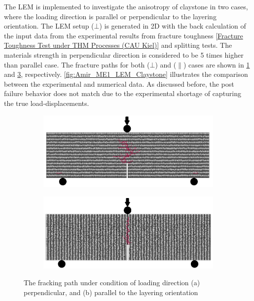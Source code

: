 The LEM is implemented to investigate the anisotropy of claystone in two cases, where the loading direction is parallel or perpendicular to the layering orientation. The LEM setup ($\bot$) is generated in 2D with the back calculation of the input data from the experimental results from fracture toughness \ref{Fracture Toughness Test under THM Processes (CAU Kiel)} and splitting \label{Brazilian Disk Test under THM Processes (CAU Kiel)} tests. The materials strength in perpendicular direction is considered to be 5 times higher than parallel case. The fracture paths for both ($\bot$) and ($\parallel$) cases are shown in \ref{fig:Amir_ME1_LEM_Perpendicular} and \ref{fig:Amir_ME1_LEM_Parallel}, respectively. \ref{fig:Amir_ME1_LEM_Claystone} illustrates the comparison between the experimental and numerical data. As discussed before, the post failure behavior does not match due to the experimental shortage of capturing the true load-displacements.

\begin{figure}[!ht]
\centering
\begin{subfigure}[b]{0.55\textwidth}
\includegraphics[width=1\linewidth]{figures/Amir_ME1_LEM_Perpendicular.png}
\subcaption{}
\label{fig:Amir_ME1_LEM_Perpendicular}
\end{subfigure}
\begin{subfigure}[b]{0.55\textwidth}
\includegraphics[width=1\linewidth]{figures/Amir_ME1_LEM_Parallel.png}
\subcaption{}
\label{fig:Amir_ME1_LEM_Parallel}
\end{subfigure}
\caption{The fracking path under condition of loading direction (a) perpendicular, and (b) parallel to the layering orientation}
\end{figure}

